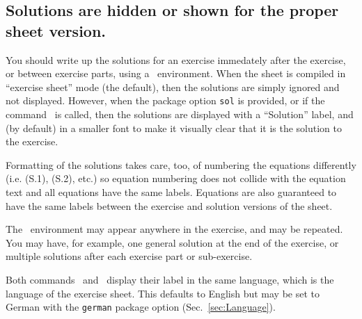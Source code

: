 \documentclass[11pt,a4paper]{article}
\begin{document}
\subsection{Solutions are hidden or shown for the proper sheet version.}

You should write up the solutions for an exercise immedately after the exercise, or
between exercise parts, using
a~ environment. When the sheet is compiled in ``exercise sheet'' mode
(the default), then the solutions are simply ignored and not displayed. However, when the
package option {\tt sol} is provided, or if the command~
is called, then the solutions are displayed with a ``Solution'' label, and (by default) in
a smaller font to make it visually clear that it is the solution to the exercise.

Formatting of the solutions takes care, too, of numbering the equations differently
(i.e. (S.1), (S.2), etc.) so equation numbering does not collide with the equation text
and all equations have the same labels. Equations are also guaranteed to have the same
labels between the exercise and solution versions of the sheet.

The~ environment may appear anywhere in the exercise, and may be
repeated. You may have, for example, one general solution at the end of the exercise, or
multiple solutions after each exercise part or sub-exercise.



\begin{pkgnotice}
  Both commands~ and~ display their label in the same
  language, which is the language of the exercise sheet. This defaults to English but may
  be set to German with the {\tt german} package option (Sec.~\ref{sec:Language}).
\end{pkgnotice}
\end{document}
